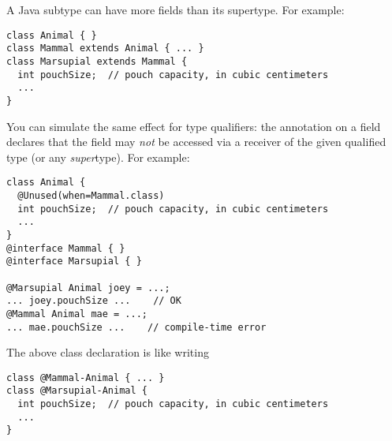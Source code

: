 A Java subtype can have more fields than its supertype.  For example:

\begin{Verbatim}
class Animal { }
class Mammal extends Animal { ... }
class Marsupial extends Mammal {
  int pouchSize;  // pouch capacity, in cubic centimeters
  ...
}
\end{Verbatim}

You can simulate
the same effect for type qualifiers:
the  annotation
on a field declares that the field may \emph{not} be accessed via a receiver of
the given qualified type (or any \emph{super}type).
For example:

\begin{Verbatim}
class Animal {
  @Unused(when=Mammal.class)
  int pouchSize;  // pouch capacity, in cubic centimeters
  ...
}
@interface Mammal { }
@interface Marsupial { }

@Marsupial Animal joey = ...;
... joey.pouchSize ...    // OK
@Mammal Animal mae = ...;
... mae.pouchSize ...    // compile-time error
\end{Verbatim}

The above class declaration is like writing

\begin{Verbatim}
class @Mammal-Animal { ... }
class @Marsupial-Animal {
  int pouchSize;  // pouch capacity, in cubic centimeters
  ...
}
\end{Verbatim}



